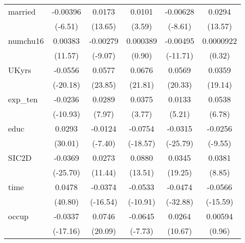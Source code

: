 \begin{table}[htbp]
\begin{tabular}{l*{5}{c}}
married     &    -0.00396\sym{***}&      0.0173\sym{***}&      0.0101\sym{***}&    -0.00628\sym{***}&      0.0294\sym{***}\\
            &     (-6.51)         &     (13.65)         &      (3.59)         &     (-8.61)         &     (13.57)         \\
numchu16    &     0.00383\sym{***}&    -0.00279\sym{***}&    0.000389         &    -0.00495\sym{***}&   0.0000922         \\
            &     (11.57)         &     (-9.07)         &      (0.90)         &    (-11.71)         &      (0.32)         \\
UKyrs       &     -0.0556\sym{***}&      0.0577\sym{***}&      0.0676\sym{***}&      0.0569\sym{***}&      0.0359\sym{***}\\
            &    (-20.18)         &     (23.85)         &     (21.81)         &     (20.33)         &     (19.14)         \\
exp\_ten     &     -0.0236\sym{***}&      0.0289\sym{***}&      0.0375\sym{***}&      0.0133\sym{***}&      0.0538\sym{***}\\
            &    (-10.93)         &      (7.97)         &      (3.77)         &      (5.21)         &      (6.78)         \\
educ        &      0.0293\sym{***}&     -0.0124\sym{***}&     -0.0754\sym{***}&     -0.0315\sym{***}&     -0.0256\sym{***}\\
            &     (30.01)         &     (-7.40)         &    (-18.57)         &    (-25.79)         &     (-9.55)         \\
SIC2D       &     -0.0369\sym{***}&      0.0273\sym{***}&      0.0880\sym{***}&      0.0345\sym{***}&      0.0381\sym{***}\\
            &    (-25.70)         &     (11.44)         &     (13.51)         &     (19.25)         &      (8.85)         \\
time        &      0.0478\sym{***}&     -0.0374\sym{***}&     -0.0533\sym{***}&     -0.0474\sym{***}&     -0.0566\sym{***}\\
            &     (40.80)         &    (-16.54)         &    (-10.91)         &    (-32.88)         &    (-15.59)         \\
occup       &     -0.0337\sym{***}&      0.0746\sym{***}&     -0.0645\sym{***}&      0.0264\sym{***}&     0.00594         \\
            &    (-17.16)         &     (20.09)         &     (-7.73)         &     (10.67)         &      (0.96)         \\

\end{tabular}
\end{table}
